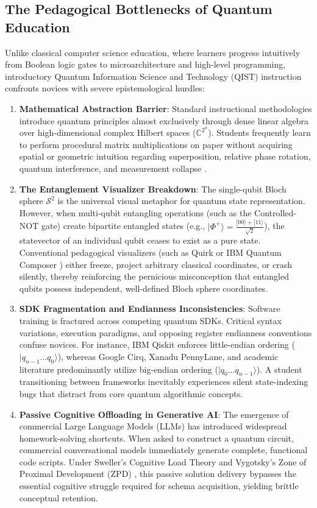 \documentclass[conference]{IEEEtran}
\begin{document}
\subsection{The Pedagogical Bottlenecks of Quantum Education}
Unlike classical computer science education, where learners progress intuitively from Boolean logic gates to microarchitecture and high-level programming, introductory Quantum Information Science and Technology (QIST) instruction confronts novices with severe epistemological hurdles:
\begin{enumerate}[leftmargin=*,itemsep=3pt]
    \item \textbf{Mathematical Abstraction Barrier}: Standard instructional methodologies introduce quantum principles almost exclusively through dense linear algebra over high-dimensional complex Hilbert spaces ($\mathbb{C}^{2^n}$). Students frequently learn to perform procedural matrix multiplications on paper without acquiring spatial or geometric intuition regarding superposition, relative phase rotation, quantum interference, and measurement collapse \cite{b4}.
    \item \textbf{The Entanglement Visualizer Breakdown}: The single-qubit Bloch sphere $\mathcal{S}^2$ is the universal visual metaphor for quantum state representation. However, when multi-qubit entangling operations (such as the Controlled-NOT gate) create bipartite entangled states (e.g., $|\Phi^+\rangle = \frac{|00\rangle + |11\rangle}{\sqrt{2}}$), the statevector of an individual qubit ceases to exist as a pure state. Conventional pedagogical visualizers (such as Quirk \cite{b5} or IBM Quantum Composer \cite{b6}) either freeze, project arbitrary classical coordinates, or crash silently, thereby reinforcing the pernicious misconception that entangled qubits possess independent, well-defined Bloch sphere coordinates.
    \item \textbf{SDK Fragmentation and Endianness Inconsistencies}: Software training is fractured across competing quantum SDKs. Critical syntax variations, execution paradigms, and opposing register endianness conventions confuse novices. For instance, IBM Qiskit enforces little-endian ordering ($|q_{n-1} \dots q_0\rangle$), whereas Google Cirq, Xanadu PennyLane, and academic literature predominantly utilize big-endian ordering ($|q_0 \dots q_{n-1}\rangle$). A student transitioning between frameworks inevitably experiences silent state-indexing bugs that distract from core quantum algorithmic concepts.
    \item \textbf{Passive Cognitive Offloading in Generative AI}: The emergence of commercial Large Language Models (LLMs) has introduced widespread homework-solving shortcuts. When asked to construct a quantum circuit, commercial conversational models immediately generate complete, functional code scripts. Under Sweller's Cognitive Load Theory \cite{b7} and Vygotsky's Zone of Proximal Development (ZPD) \cite{b8}, this passive solution delivery bypasses the essential cognitive struggle required for schema acquisition, yielding brittle conceptual retention.
\end{enumerate}
\end{document}
